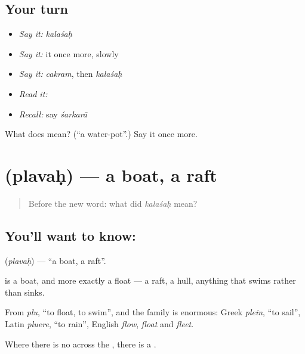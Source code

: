 \subsection*{Your turn}
\begin{itemize}
\raggedright
  \item \emph{Say it:} \emph{kalaśaḥ}
  \item \emph{Say it:} it once more, slowly
  \item \emph{Say it:} \emph{cakram}, then \emph{kalaśaḥ}
  \item \emph{Read it:} \textbf{}
  \item \emph{Recall:} say \emph{śarkarā}
\end{itemize}

\begin{tcolorbox}[breakable,colback=teal!4,colframe=teal!35!black,title={Before you move on}]
What does  mean? (\textquotedblleft{}a water-pot\textquotedblright{}.) Say it once more.
\end{tcolorbox}
\section[\texorpdfstring{\sk{प्लवः} (plavaḥ)}{प्लवः (plavaḥ)}]{ (plavaḥ) — a boat, a raft}

\label{lesson:SA-C41-boat}



\begin{quote}
Before the new word: what did \emph{kalaśaḥ} mean?
\end{quote}

\subsection*{You'll want to know: }
\textbf{} (\emph{plavaḥ}) — \textquotedblleft{}a boat, a raft\textquotedblright{}.

\textbf{} is a boat, and more exactly a float — a raft, a hull, anything that swims rather than sinks.

From \emph{plu}, \textquotedblleft{}to float, to swim\textquotedblright{}, and the family is enormous: Greek \emph{plein}, \textquotedblleft{}to sail\textquotedblright{}, Latin \emph{pluere}, \textquotedblleft{}to rain\textquotedblright{}, English \emph{flow}, \emph{float} and \emph{fleet}.

Where there is no  across the , there is a \textbf{}.

